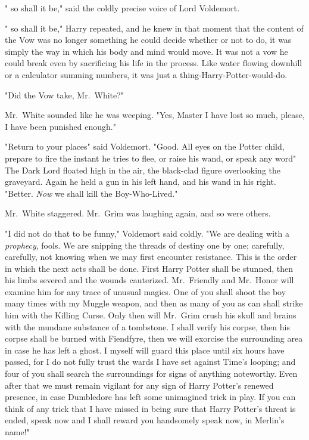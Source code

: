 "{\el} so shall it be," said the coldly precise voice of Lord Voldemort.

"{\el} so shall it be," Harry repeated, and he knew in that moment that the
content of the Vow was no longer something he could decide whether or not to
do, it was simply the way in which his body and mind would move. It was not a
vow he could break even by sacrificing his life in the process. Like water
flowing downhill or a calculator summing numbers, it was just a
thing-Harry-Potter-would-do.

"Did the Vow take, Mr.~White?"

Mr.~White sounded like he was weeping. "Yes, Master{\el} I have lost so
much, please, I have been punished enough."

"Return to your places{\el}" said Voldemort. "Good. All eyes on the Potter
child, prepare to fire the instant he tries to flee, or raise his wand, or
speak any word{\el}" The Dark Lord floated high in the air, the black-clad
figure overlooking the graveyard. Again he held a gun in his left hand, and his
wand in his right. "Better. \emph{Now} we shall kill the Boy-Who-Lived."

Mr.~White staggered. Mr.~Grim was laughing again, and so were others.

"I did not do that to be funny," Voldemort said coldly. "We are dealing with a
\emph{prophecy}, fools. We are snipping the threads of destiny one by one;
carefully, carefully, not knowing when we may first encounter resistance. This
is the order in which the next acts shall be done. First Harry Potter shall be
stunned, then his limbs severed and the wounds cauterized. Mr.~Friendly and
Mr.~Honor will examine him for any trace of unusual magics. One of you shall
shoot the boy many times with my Muggle weapon, and then as many of you as can
shall strike him with the Killing Curse. Only then will Mr.~Grim crush his
skull and brains with the mundane substance of a tombstone. I shall verify his
corpse, then his corpse shall be burned with Fiendfyre, then we will exorcise
the surrounding area in case he has left a ghost. I myself will guard this
place until six hours have passed, for I do not fully trust the wards I have
set against Time's looping; and four of you shall search the surroundings for
signs of anything noteworthy. Even after that we must remain vigilant for any
sign of Harry Potter's renewed presence, in case Dumbledore has left some
unimagined trick in play. If you can think of any trick that I have missed in
being sure that Harry Potter's threat is ended, speak now and I shall reward
you handsomely{\el} speak now, in Merlin's name!"

